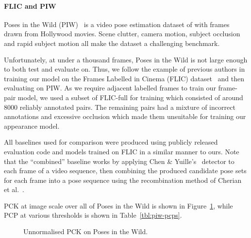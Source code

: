 \documentclass[runningheads]{llncs}
\begin{document}
\paragraph{FLIC and PIW} Poses in the Wild (PIW)~\cite{cherian2014mixing} is a
video pose estimation dataset of with frames drawn from Hollywood movies. Scene
clutter, camera motion, subject occlusion and rapid subject motion all make the
dataset a challenging benchmark.

Unfortunately, at under a thousand frames, Poses in the Wild is not large enough
to both test and evaluate on. Thus, we follow the example of previous authors in
training our model on the Frames Labelled in Cinema (FLIC)
dataset~\cite{sapp2013modec} and then evaluating on PIW\@. As we require
adjacent labelled frames to train our frame-pair model, we used a subset of
FLIC-full for training which consisted of around 8000 reliably annotated pairs.
The remaining pairs had a mixture of incorrect annotations and excessive
occlusion which made them unsuitable for training our appearance model.

All baselines used for comparison were produced using publicly released
evaluation code and models trained on FLIC in a similar manner to ours. Note
that the ``combined'' baseline works by applying Chen \&
Yuille's~\cite{chen2014articulated} detector to each frame of a video sequence,
then combining the produced candidate pose sets for each frame into a pose
sequence using the recombination method of Cherian et
al.~\cite{cherian2014mixing}.

PCK at image scale over all of Poses in the Wild is shown in
Figure~\ref{fig:piw-pcks}, while PCP at various thresholds is shown in
Table~\ref{tbl:piw-pcps}.

\begin{figure}[t]
\begin{center}

\end{center}
\caption{Unnormalised PCK on Poses in the Wild.}
\label{fig:piw-pcks}
\end{figure}
\end{document}
